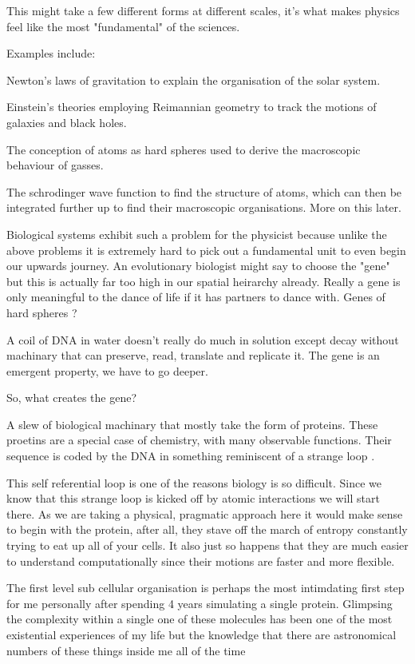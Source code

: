 This might take a few different forms at different scales, it's what makes physics feel like the most "fundamental" of the sciences. 

Examples include:

Newton's laws of gravitation to explain the organisation of the solar system. 

Einstein's theories employing Reimannian geometry to track the motions of galaxies and black holes.

The conception of atoms as hard spheres used to derive the macroscopic behaviour of gasses.

The schrodinger wave function to find the structure of atoms, which can then be integrated further up to find their macroscopic organisations. More on this later.

Biological systems exhibit such a problem for the physicist because unlike the above problems it is extremely hard to pick out a fundamental unit to even begin our upwards journey. An evolutionary biologist might say to choose the "gene" but this is actually far too high in our spatial heirarchy already. Really a gene is only meaningful to the dance of life if it has partners to dance with. Genes of hard spheres ?

A coil of DNA in water doesn't really do much in solution except decay without machinary that can preserve, read, translate and replicate it. The gene is an emergent property, we have to go deeper. 

So, what creates the gene? 

A slew of biological machinary that mostly take the form of proteins. These proetins are a special case of chemistry, with many observable functions. Their sequence is  coded by the DNA in something reminiscent of a strange loop \cite{Hoffstadter2008}. 

This self referential loop is one of the reasons biology is so difficult. Since we know that this strange loop is kicked off by atomic interactions we will start there. As we are taking a physical, pragmatic approach here it would make sense to begin with the protein, after all, they stave off the march of entropy constantly trying to eat up all of your cells. It also just so happens that they are much easier to understand computationally since their motions are faster and more flexible. 

The first level sub cellular organisation is perhaps the most intimdating first step for me personally after spending 4 years simulating a single protein. Glimpsing the complexity within a single one of these molecules has been one of the most existential experiences of my life but the knowledge that there are astronomical numbers of these things inside me all of the time 

